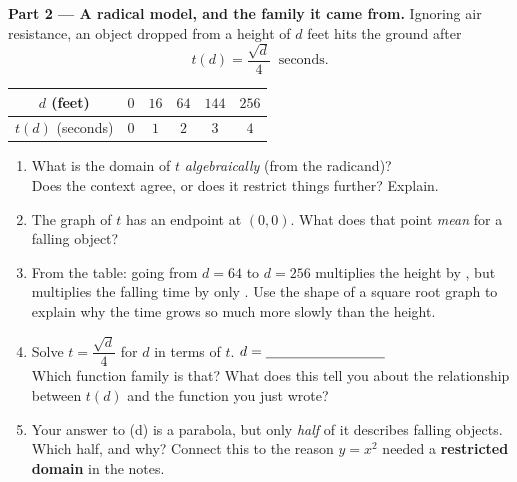 \documentclass[10pt]{article}
\begin{document}
\begin{tcolorbox}[colback=white, colframe=black!40, title=\textbf{Tier E --- Extension},
    fonttitle=\bfseries, arc=1.5mm, left=3mm, right=3mm, top=2mm, bottom=2mm, breakable]
\vspace{5pt}
\textbf{Part 2 --- A radical model, and the family it came from.} Ignoring air resistance, an object
dropped from a height of $d$ feet hits the ground after
\[
  t(d) = \frac{\sqrt{d}}{4} \ \text{ seconds.}
\]
\begin{center}
\renewcommand{\arraystretch}{1.25}
\begin{tabular}{|c|c|c|c|c|c|}
\hline
$d$ (feet) & $0$ & $16$ & $64$ & $144$ & $256$ \\ \hline
$t(d)$ (seconds) & $0$ & $1$ & $2$ & $3$ & $4$ \\ \hline
\end{tabular}
\end{center}
\begin{enumerate}[label=(\alph*), leftmargin=1.9em, itemsep=6pt]
  \item What is the domain of $t$ \emph{algebraically} (from the radicand)? \blank{3.0cm} \\
        Does the context agree, or does it restrict things further? Explain. 
  \item The graph of $t$ has an endpoint at $(0,0)$. What does that point \emph{mean} for a falling
        object? 
  \item From the table: going from $d=64$ to $d=256$ multiplies the height by \blank{1.2cm}, but
        multiplies the falling time by only \blank{1.2cm}. Use the shape of a square root graph to
        explain why the time grows so much more slowly than the height. 
  \item Solve $t=\dfrac{\sqrt{d}}{4}$ for $d$ in terms of $t$. \quad $d=\blank{3.0cm}$ \\
        Which function family is that? \blank{2.6cm} \quad What does this tell you about the
        relationship between $t(d)$ and the function you just wrote? 
  \item Your answer to (d) is a parabola, but only \emph{half} of it describes falling objects.
        Which half, and why? Connect this to the reason $y=x^2$ needed a \textbf{restricted domain}
        in the notes. 
\end{enumerate}
\end{tcolorbox}
\end{document}
